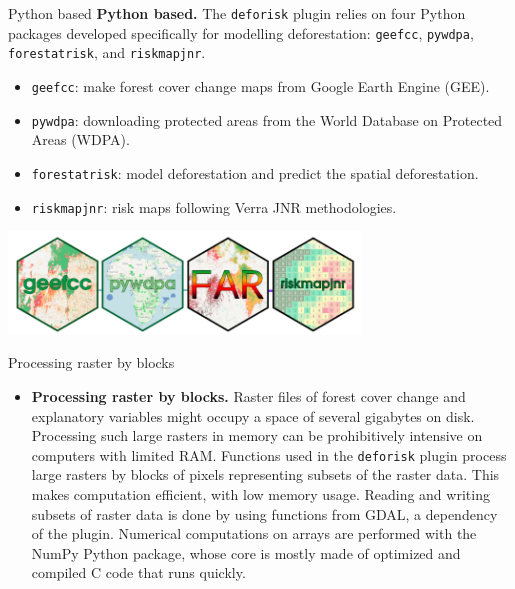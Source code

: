 \documentclass[10pt,table,dvipsnames,compress]{beamer}
\begin{document}
\begin{frame}[label={sec:org08148c9},fragile]{Python based}
 \textbf{Python based.} The \texttt{deforisk} plugin relies on four Python packages developed specifically for modelling deforestation: \texttt{geefcc}, \texttt{pywdpa}, \texttt{forestatrisk}, and \texttt{riskmapjnr}.

\begin{itemize}
\item \texttt{geefcc}: make forest cover change maps from Google Earth Engine (GEE).
\item \texttt{pywdpa}: downloading protected areas from the World Database on Protected Areas (WDPA).
\item \texttt{forestatrisk}: model deforestation and predict the spatial deforestation.
\item \texttt{riskmapjnr}: risk maps following Verra JNR methodologies.
\end{itemize}

\begin{center}
\includegraphics[width=0.7\textwidth]{figs/logos-packages.png}
\end{center}
\end{frame}

\begin{frame}[label={sec:org084c211},fragile]{Processing raster by blocks}
 \begin{itemize}
\item \textbf{Processing raster by blocks.} Raster files of forest cover change and explanatory variables might occupy a space of several gigabytes on disk. Processing such large rasters in memory can be prohibitively intensive on computers with limited RAM. Functions used in the \texttt{deforisk} plugin process large rasters by blocks of pixels representing subsets of the raster data. This makes computation efficient, with low memory usage. Reading and writing subsets of raster data is done by using functions from GDAL, a dependency of the plugin. Numerical computations on arrays are performed with the NumPy Python package, whose core is mostly made of optimized and compiled C code that runs quickly.
\end{itemize}
\end{frame}
\end{document}
